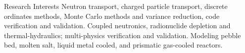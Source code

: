 \begin{rubric}{Research Interests}
%
  Neutron transport, charged particle transport, discrete ordinates methods, Monte Carlo methods and variance reduction, code verification and validation.
%
  Coupled neutronics, radionuclide depletion and thermal-hydraulics; multi-physics verification and validation.
%
  Modeling pebble bed, molten salt, liquid metal cooled, and prismatic gas-cooled reactors.
\end{rubric}
